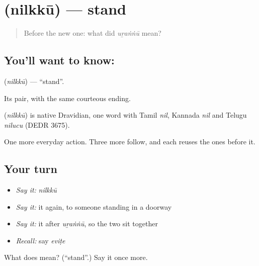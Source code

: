 \section[\texorpdfstring{\ml{നിൽക്കൂ} (nilkkū)}{നിൽക്കൂ (nilkkū)}]{ (nilkkū) — stand}

\label{lesson:ML-C43-stand}



\begin{quote}
Before the new one: what did \emph{uṟaṅṅū} mean?
\end{quote}

\subsection*{You'll want to know: }
\textbf{} (\emph{nilkkū}) — \textquotedblleft{}stand\textquotedblright{}.

Its pair, with the same courteous ending.

\begin{cousinweb}
\textbf{} (\emph{nilkkū}) is native Dravidian, one word with Tamil \emph{nil}, Kannada \emph{nil} and Telugu \emph{nilucu} (DEDR 3675).
\end{cousinweb}

\begin{grammarlens}[title={What you've built}]
One more everyday action. Three more follow, and each reuses the ones before it.
\end{grammarlens}

\subsection*{Your turn}
\begin{itemize}
\raggedright
  \item \emph{Say it:} \emph{nilkkū}
  \item \emph{Say it:} it again, to someone standing in a doorway
  \item \emph{Say it:} it after \emph{uṟaṅṅū}, so the two sit together
  \item \emph{Recall:} say \emph{eviṭe}
\end{itemize}

\begin{tcolorbox}[breakable,colback=teal!4,colframe=teal!35!black,title={Before you move on}]
What does  mean? (\textquotedblleft{}stand\textquotedblright{}.) Say it once more.
\end{tcolorbox}
